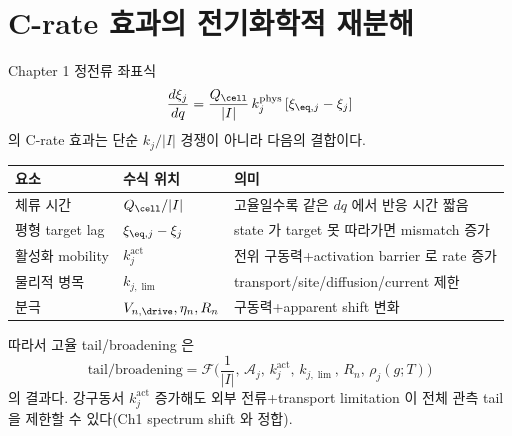 \section{C-rate 효과의 전기화학적 재분해}\label{sec:ch3_crate}
Chapter 1 정전류 좌표식
\begin{equation}
\frac{d\xi_j}{dq}=\frac{Q_\cell}{|I|}\,k_j^{\mathrm{phys}}\,[\xi_{\eq,j}-\xi_j]
\label{eq:ch3_crate}
\end{equation}
의 C-rate 효과는 단순 $k_j/|I|$ 경쟁이 아니라 다음의 결합이다.
\begin{longtable}{p{} p{} p{}}
\toprule 요소 & 수식 위치 & 의미 \\ \midrule \endhead
체류 시간 & $Q_\cell/|I|$ & 고율일수록 같은 $dq$ 에서 반응 시간 짧음 \\
평형 target lag & $\xi_{\eq,j}-\xi_j$ & state 가 target 못 따라가면 mismatch 증가 \\
활성화 mobility & $k_j^{\mathrm{act}}$ & 전위 구동력+activation barrier 로 rate 증가 \\
물리적 병목 & $k_{j,\lim}$ & transport/site/diffusion/current 제한 \\
분극 & $V_{n,\drive},\eta_n,R_n$ & 구동력+apparent shift 변화 \\
\bottomrule
\end{longtable}
따라서 고율 tail/broadening 은
\begin{equation}
\mathrm{tail/broadening}=\mathcal F\!\Big(\frac{1}{|I|},\,\mathcal A_j,\,k_j^{\mathrm{act}},\,k_{j,\lim},\,R_n,\,\rho_j(g;T)\Big)
\label{eq:ch3_tail_function}
\end{equation}
의 결과다. 강구동서 $k_j^{\mathrm{act}}$ 증가해도 외부 전류+transport limitation 이 전체 관측 tail 을
제한할 수 있다(Ch1 spectrum shift 와 정합).

